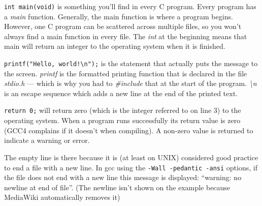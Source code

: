 \texttt{int main(void)} is something you'll find in every C program. Every
program has a \emph{main} function. Generally, the main function is where a
program begins. However, one C program can be scattered across multiple files,
so you won't always find a main function in every file.
The \emph{int} at the beginning means that main will return an integer to the
operating system when it is finished.

\texttt{printf("Hello, world!\textbackslash{}n");} is the statement that
actually puts the message to the screen. \emph{printf} is the formatted
printing function that is declared in the file \emph{stdio.h} --- which is why
you had to \emph{\#include} that at the start of the program.
\emph{\textbackslash{}n} is an escape sequence which adds a new line at the end
of the printed text.

\texttt{return 0;} will return zero (which is the integer referred to on line
3) to the operating system. When a program runs successfully its return value
is zero (GCC4 complains if it doesn't when compiling). A non-zero value is
returned to indicate a warning or error.

The empty line is there because it is (at least on UNIX) considered good
practice to end a file with a new line. In gcc using the \texttt{-Wall
-pedantic -ansi} options, if the file does not end with a new line this message
is displayed: ``warning: no newline at end of file''. (The newline isn't shown
on the example because MediaWiki automatically removes it)
